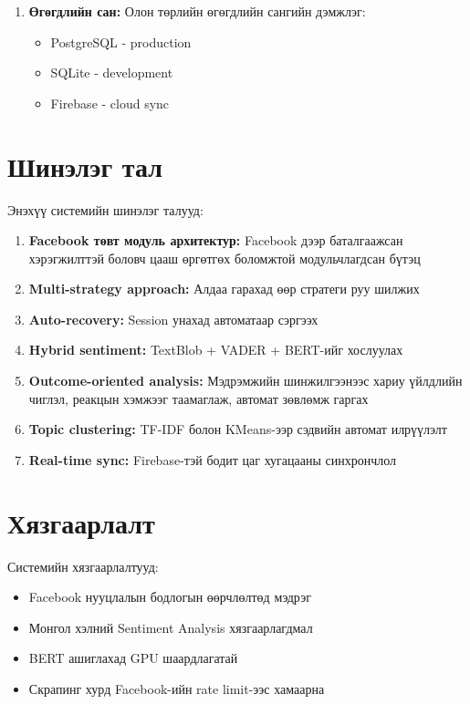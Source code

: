 \documentclass[12pt,a4paper]{report}
\begin{document}
\begin{enumerate}
    \item \textbf{Өгөгдлийн сан:} Олон төрлийн өгөгдлийн сангийн дэмжлэг:
    \begin{itemize}
        \item PostgreSQL - production
        \item SQLite - development
        \item Firebase - cloud sync
    \end{itemize}
\end{enumerate}

\section{Шинэлэг тал}

Энэхүү системийн шинэлэг талууд:

\begin{enumerate}
    \item \textbf{Facebook төвт модуль архитектур:} Facebook дээр баталгаажсан хэрэгжилттэй боловч цааш өргөтгөх боломжтой модульчлагдсан бүтэц
    \item \textbf{Multi-strategy approach:} Алдаа гарахад өөр стратеги руу шилжих
    \item \textbf{Auto-recovery:} Session унахад автоматаар сэргээх
    \item \textbf{Hybrid sentiment:} TextBlob + VADER + BERT-ийг хослуулах
    \item \textbf{Outcome-oriented analysis:} Мэдрэмжийн шинжилгээнээс хариу үйлдлийн чиглэл, реакцын хэмжээг таамаглаж, автомат зөвлөмж гаргах
    \item \textbf{Topic clustering:} TF-IDF болон KMeans-ээр сэдвийн автомат илрүүлэлт
    \item \textbf{Real-time sync:} Firebase-тэй бодит цаг хугацааны синхрончлол
\end{enumerate}

\section{Хязгаарлалт}

Системийн хязгаарлалтууд:

\begin{itemize}
    \item Facebook нууцлалын бодлогын өөрчлөлтөд мэдрэг
    \item Монгол хэлний Sentiment Analysis хязгаарлагдмал
    \item BERT ашиглахад GPU шаардлагатай
    \item Скрапинг хурд Facebook-ийн rate limit-ээс хамаарна
\end{itemize}
\end{document}
